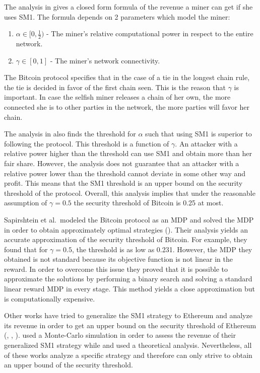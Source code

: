 \documentclass{article}
\begin{document}
The analysis in \cite{eyalmajority} gives a closed form formula of the revenue a miner can get if she uses SM1. The formula depends on 2 parameters which model the miner:
\begin{enumerate}
    \item $\alpha \in [0, \frac{1}{2})$ - The miner's relative computational power in respect to the entire network.
    \item $\gamma \in [0, 1]$ - The miner's network connectivity.
\end{enumerate}
The Bitcoin protocol specifies that in the case of a tie in the longest chain rule, the tie is decided in favor of the first chain seen. This is the reason that $\gamma$ is important. In case the selfish miner releases a chain of her own, the more connected she is to other parties in the network, the more parties will favor her chain.

The analysis in \cite{eyalmajority} also finds the threshold for $\alpha$ such that using SM1 is superior to following the protocol. This threshold is a function of $\gamma$. An attacker with a relative power higher than the threshold can use SM1 and obtain more than her fair share. However, the analysis does not guarantee that an attacker with a relative power lower than the threshold cannot deviate in some other way and profit. This means that the SM1 threshold is an upper bound on the security threshold of the protocol. Overall, this analysis implies that under the reasonable assumption of $\gamma = 0.5$ the security threshold of Bitcoin is 0.25 at most.

Sapirshtein et al.~modeled the Bitcoin protocol as an MDP and solved the MDP in order to obtain approximately optimal strategies (\cite{sapirshtein2016optimal}). Their analysis yields an accurate approximation of the security threshold of Bitcoin. For example, they found that for $\gamma = 0.5$, the threshold is as low as 0.231. However, the MDP they obtained is not standard because its objective function is not linear in the reward. In order to overcome this issue they proved that it is possible to approximate the solutions by performing a binary search and solving a standard linear reward MDP in every stage. This method yields a close approximation but is computationally expensive.

Other works have tried to generalize the SM1 strategy to Ethereum and analyze its revenue in order to get an upper bound on the security threshold of Ethereum (\cite{ritz2018impact}, \cite{feng2019selfish}, \cite{grunspan2019selfish}). \cite{ritz2018impact} used a Monte-Carlo simulation in order to assess the revenue of their generalized SM1 strategy while \cite{feng2019selfish} and \cite{grunspan2019selfish} used a theoretical analysis. Nevertheless, all of these works analyze a specific strategy and therefore can only strive to obtain an upper bound of the security threshold.
\end{document}
